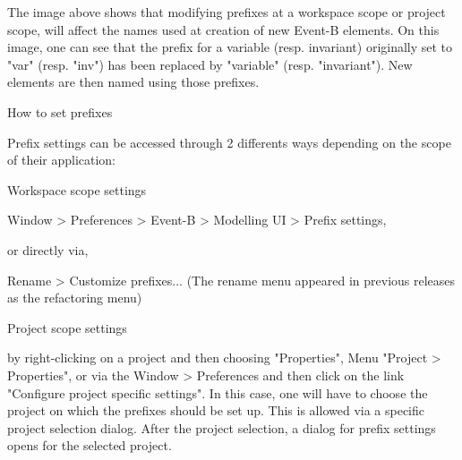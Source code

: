 
The image above shows that modifying prefixes at a workspace scope or project scope, will affect the names used at creation of new Event-B elements. On this image, one can see that the prefix for a variable (resp. invariant) originally set to "var" (resp. "inv") has been replaced by "variable" (resp. "invariant"). New elements are then named using those prefixes.

How to set prefixes

Prefix settings can be accessed through 2 differents ways depending on the scope of their application:

Workspace scope settings

Window > Preferences > Event-B > Modelling UI > Prefix settings, 
    

or directly via,

    Rename > Customize prefixes... (The rename menu appeared in previous releases as the refactoring menu) 


Project scope settings

    by right-clicking on a project and then choosing "Properties",
    Menu "Project > Properties",
    or via the Window > Preferences and then click on the link "Configure project specific settings". In this case, one will have to choose the project on which the prefixes should be set up. This is allowed via a specific project selection dialog. After the project selection, a dialog for prefix settings opens for the selected project. 


